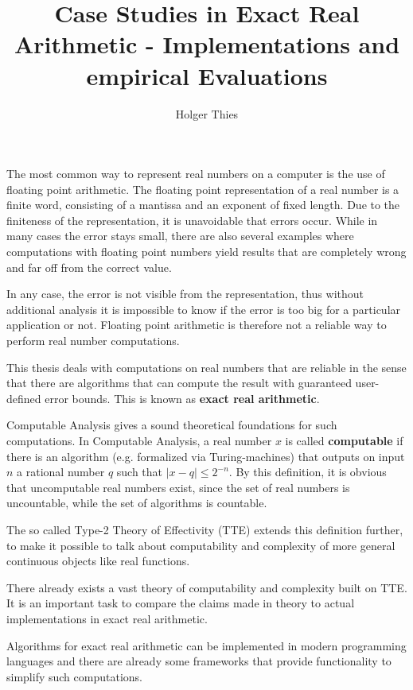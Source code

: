 \documentclass[]{article}
\title{Case Studies in Exact Real Arithmetic - Implementations and empirical
Evaluations}
\author{Holger Thies}
\date{}
\newcommand{\abs}[1]{\left|#1\right|}
\begin{document}
\maketitle
The most common way to represent real numbers on a computer is the use of floating point
arithmetic.
The floating point representation of a real number is a finite word, consisting
of a mantissa and an exponent of fixed length.
Due to the finiteness of the representation, it is unavoidable that errors
occur.
While in many cases the error stays small, there are also several examples
where computations with floating point numbers yield results that are
completely wrong and far off from the correct value.

In any case, the error is not visible from the representation, thus without
additional analysis it is impossible to know if the error is too big for a
particular application or not.
Floating point arithmetic is therefore not a reliable way to perform real number
computations.

This thesis deals with computations on real numbers that are reliable in the
sense that there are algorithms that can compute the result with guaranteed
user-defined error bounds.
This is known as \textbf{exact real arithmetic}.

Computable Analysis gives a sound theoretical foundations for such
computations.
In Computable Analysis, a real number $x$ is called \textbf{computable} if there is
an algorithm (e.g. formalized via Turing-machines) that outputs on input $n$ a rational number $q$ such that
$\abs{x-q} \leq 2^{-n}$. 
By this definition, it is obvious that uncomputable real numbers exist, since
the set of real numbers is uncountable, while the set of algorithms is
countable.

The so called Type-2 Theory of Effectivity (TTE) \cite{Wei} extends this definition
further, to make it possible to talk about computability and complexity of more
general continuous objects like real functions.

There already exists a vast theory of computability and complexity built on
TTE.
It is an important task to compare the claims made in theory to actual
implementations in exact real arithmetic.

Algorithms for exact real arithmetic can be implemented in modern programming
languages and there are already some frameworks that provide functionality to
simplify such computations.
\end{document}
